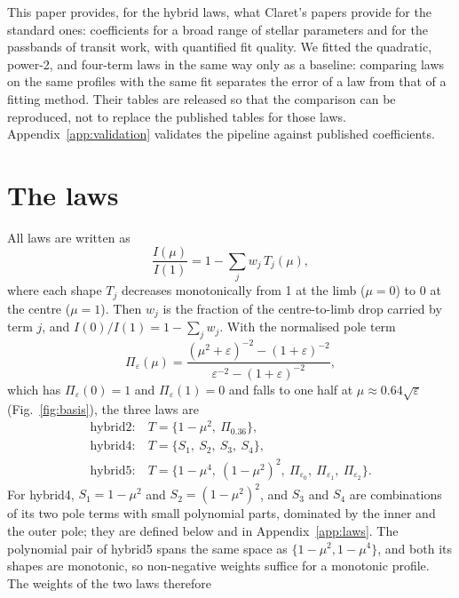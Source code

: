 \documentclass{aa}
\begin{document}
This paper provides, for the hybrid laws, what Claret's papers provide for the
standard ones: coefficients for a broad range of stellar parameters and for the
passbands of transit work, with quantified fit quality. We fitted the
quadratic, power-2, and four-term laws in the same way only as a baseline:
comparing laws on the same profiles with the same fit separates the error of a
law from that of a fitting method. Their tables are released so that the
comparison can be reproduced, not to replace the published tables for those
laws. Appendix~\ref{app:validation} validates the pipeline against published
coefficients.

\section{The laws}\label{sec:laws}
All laws are written as
\begin{equation}
\frac{I(\mu)}{I(1)}=1-\sum_j w_j\,T_j(\mu),
\end{equation}
where each shape $T_j$ decreases monotonically from 1 at the limb ($\mu=0$) to
0 at the centre ($\mu=1$). Then $w_j$ is the fraction of the centre-to-limb drop
carried by term $j$, and $I(0)/I(1)=1-\sum_j w_j$. With the normalised pole term
\begin{equation}
\Pi_\varepsilon(\mu)=\frac{(\mu^2+\varepsilon)^{-2}-(1+\varepsilon)^{-2}}{\varepsilon^{-2}-(1+\varepsilon)^{-2}},
\end{equation}
which has $\Pi_\varepsilon(0)=1$ and $\Pi_\varepsilon(1)=0$ and falls to one half
at $\mu\approx0.64\sqrt\varepsilon$ (Fig.~\ref{fig:basis}), the three laws are
\begin{align}
\text{hybrid2:}\ & T=\{1-\mu^2,\ \Pi_{0.36}\},\\
\text{hybrid4:}\ & T=\{S_1,\ S_2,\ S_3,\ S_4\},\\
\text{hybrid5:}\ & T=\{1-\mu^4,\ (1-\mu^2)^2,\ \Pi_{\varepsilon_0},\ \Pi_{\varepsilon_1},\ \Pi_{\varepsilon_2}\}.
\end{align}
For hybrid4, $S_1=1-\mu^2$ and $S_2=(1-\mu^2)^2$, and $S_3$ and $S_4$ are
combinations of its two pole terms with small polynomial parts, dominated by
the inner and the outer pole; they are defined below and in
Appendix~\ref{app:laws}. The polynomial pair of hybrid5 spans the same space as
$\{1-\mu^2,1-\mu^4\}$, and both its shapes are monotonic, so non-negative
weights suffice for a monotonic profile. The weights of the two laws therefore
\end{document}

